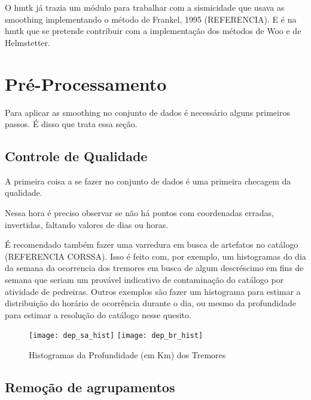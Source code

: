 O \gls{hmtk} já trazia um módulo para trabalhar com a sismicidade que usava as \gls{smoothing}
implementando o método de Frankel, 1995 (REFERENCIA). E é na \gls{hmtk} que se pretende
contribuir com a implementação dos métodos de Woo e de Helmstetter.
 
\section{Pré-Processamento}
\label{sec:pre_processamento}

Para aplicar as \gls{smoothing} no conjunto de dados é necessário alguns primeiros passos.
É disso que trata essa seção.


\subsection{Controle de Qualidade}
\label{sec:qualicontrol}

A primeira coisa a se fazer no conjunto de dados é uma primeira checagem da qualidade.

Nessa hora é preciso observar se não há pontos com coordenadas erradas, invertidas, faltando valores de dias ou horas.

É recomendado também fazer uma varredura em busca de artefatos no catálogo (REFERENCIA CORSSA).
Isso é feito com, por exemplo, um histogramas do dia da semana da ocorrencia dos tremores em busca
de algum descréscimo em fins de semana que seriam um provável indicativo de contaminação do catálogo 
por atividade de pedreiras. Outros exemplos são fazer um histograma para estimar a distribuição 
do horário de ocorrência durante o dia, ou mesmo da profundidade para estimar a resolução do catálogo
nesse quesito.

\begin{figure}[H]
  \centering
  \texttt{[image: dep\_sa\_hist]} 
  \texttt{[image: dep\_br\_hist]} 
  \caption{Histogramas da Profundidade (em Km) dos Tremores}
  \label{fig:qc_dep_hist} 
\end{figure}



\subsection{Remoção de agrupamentos}
\label{sec:declustering}

